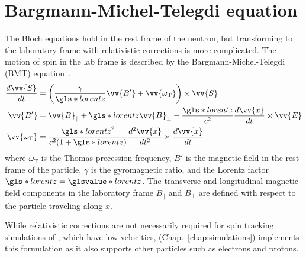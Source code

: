 
\section{Bargmann-Michel-Telegdi equation}\label{sec:BMT_equations}


The Bloch equations hold in the rest frame of the neutron, but transforming to the laboratory frame with relativistic corrections is more complicated. The motion of spin in the lab frame is described by the Bargmann-Michel-Telegdi (BMT) equation~\cite{bmt_equations}.
%
\begin{align}
    \frac{d\vv{S}}{dt} &= \left( \frac{\gamma}{\gls*{lorentz}}\vv{B'}+\vv{\omega_\text{T}}\right)\times \vv{S}\\
    \vv{B'} &= \vv{B}_\parallel + \gls*{lorentz}\vv{B}_\perp - \frac{\gls*{lorentz}}{c^2}\frac{d\vv{x}}{dt}\times\vv{E}\\
    \vv{\omega_\text{T}}&=\frac{\gls*{lorentz}^2}{c^2(1+\gls*{lorentz})}\frac{d^2\vv{x}}{dt^2}\times\frac{d\vv{x}}{dt}
\end{align}
%
where $\omega_\text{T}$ is the Thomas precession frequency, $B'$ is the magnetic field in the rest frame of the particle, $\gamma$ is the gyromagnetic ratio, and the Lorentz factor $\gls*{lorentz}=\glsvalue*{lorentz}$. The transverse and longitudinal magnetic field components in the laboratory frame $B_\parallel$ and $B_\perp$ are defined with respect to the particle traveling along $x$.

While relativistic corrections are not necessarily required for spin tracking simulations of \ucn, which have low velocities, \pentrack (Chap.~\ref{chap:simulations}) implements this formulation as it also supports other particles such as electrons and protons.